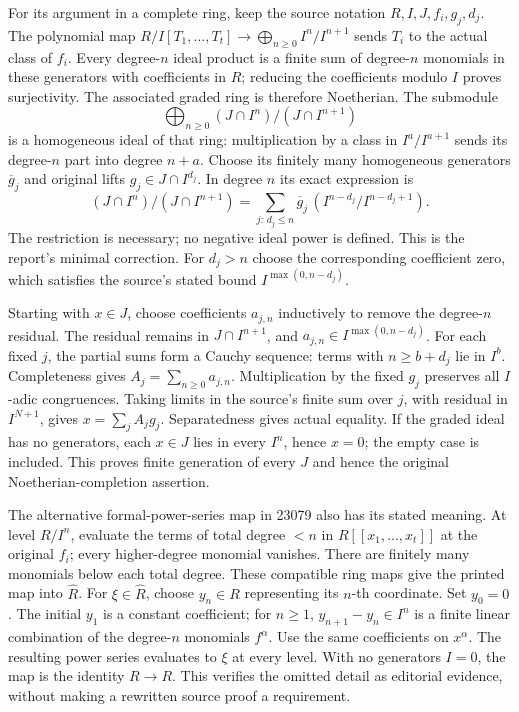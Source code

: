 For its argument in a complete ring, keep the source notation \(R,I,J,f_i,g_j,d_j\). The polynomial map \(R/I[T_1,\ldots,T_t]\to\bigoplus_{n\geq0}I^n/I^{n+1}\) sends \(T_i\) to the actual class of \(f_i\). Every degree-\(n\) ideal product is a finite sum of degree-\(n\) monomials in these generators with coefficients in \(R\); reducing the coefficients modulo \(I\) proves surjectivity. The associated graded ring is therefore Noetherian. The submodule \[
\bigoplus_{n\geq0}(J\cap I^n)/(J\cap I^{n+1})
\] is a homogeneous ideal of that ring: multiplication by a class in \(I^a/I^{a+1}\) sends its degree-\(n\) part into degree \(n+a\). Choose its finitely many homogeneous generators \(\overline g_j\) and original lifts \(g_j\in J\cap I^{d_j}\). In degree \(n\) its exact expression is \[
(J\cap I^n)/(J\cap I^{n+1})
 =\sum_{j:\,d_j\leq n}
    \overline g_j\,(I^{n-d_j}/I^{n-d_j+1}).
\] The restriction is necessary; no negative ideal power is defined. This is the report's minimal correction. For \(d_j>n\) choose the corresponding coefficient zero, which satisfies the source's stated bound \(I^{\max(0,n-d_j)}\).

Starting with \(x\in J\), choose coefficients \(a_{j,n}\) inductively to remove the degree-\(n\) residual. The residual remains in \(J\cap I^{n+1}\), and \(a_{j,n}\in I^{\max(0,n-d_j)}\). For each fixed \(j\), the partial sums form a Cauchy sequence: terms with \(n\geq b+d_j\) lie in \(I^b\). Completeness gives \(A_j=\sum_{n\geq0}a_{j,n}\). Multiplication by the fixed \(g_j\) preserves all \(I\)-adic congruences. Taking limits in the source's finite sum over \(j\), with residual in \(I^{N+1}\), gives \(x=\sum_jA_jg_j\). Separatedness gives actual equality. If the graded ideal has no generators, each \(x\in J\) lies in every \(I^n\), hence \(x=0\); the empty case is included. This proves finite generation of every \(J\) and hence the original Noetherian-completion assertion.

The alternative formal-power-series map in 23079 also has its stated meaning. At level \(R/I^n\), evaluate the terms of total degree \(<n\) in \(R[[x_1,\ldots,x_t]]\) at the original \(f_i\); every higher-degree monomial vanishes. There are finitely many monomials below each total degree. These compatible ring maps give the printed map into \(\widehat R\). For \(\xi\in\widehat R\), choose \(y_n\in R\) representing its \(n\)-th coordinate. Set \(y_0=0\). The initial \(y_1\) is a constant coefficient; for \(n\geq1\), \(y_{n+1}-y_n\in I^n\) is a finite linear combination of the degree-\(n\) monomials \(f^\alpha\). Use the same coefficients on \(x^\alpha\). The resulting power series evaluates to \(\xi\) at every level. With no generators \(I=0\), the map is the identity \(R\to R\). This verifies the omitted detail as editorial evidence, without making a rewritten source proof a requirement.

